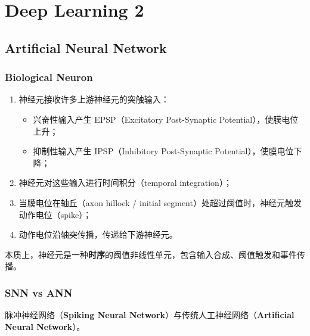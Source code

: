\section{Deep Learning 2}\label{deep-learning-2}

\subsection{Artificial Neural Network}\label{artificial-neural-network}

\subsubsection{Biological Neuron}\label{biological-neuron}

\begin{enumerate}
\def\labelenumi{\arabic{enumi}.}
\tightlist
\item
  神经元接收许多上游神经元的突触输入：

  \begin{itemize}
  \tightlist
  \item
    兴奋性输入产生 EPSP（Excitatory Post-Synaptic
    Potential），使膜电位上升；
  \item
    抑制性输入产生 IPSP（Inhibitory Post-Synaptic
    Potential），使膜电位下降；
  \end{itemize}
\item
  神经元对这些输入进行时间积分（temporal integration）；
\item
  当膜电位在轴丘（axon hillock / initial
  segment）处超过阈值时，神经元触发动作电位（spike）；
\item
  动作电位沿轴突传播，传递给下游神经元。
\end{enumerate}

本质上，神经元是一种\textbf{时序}的阈值非线性单元，包含输入合成、阈值触发和事件传播。

\subsubsection{SNN vs ANN}\label{snn-vs-ann}

脉冲神经网络（\textbf{Spiking Neural
Network}）与传统人工神经网络（\textbf{Artificial Neural Network}）。

